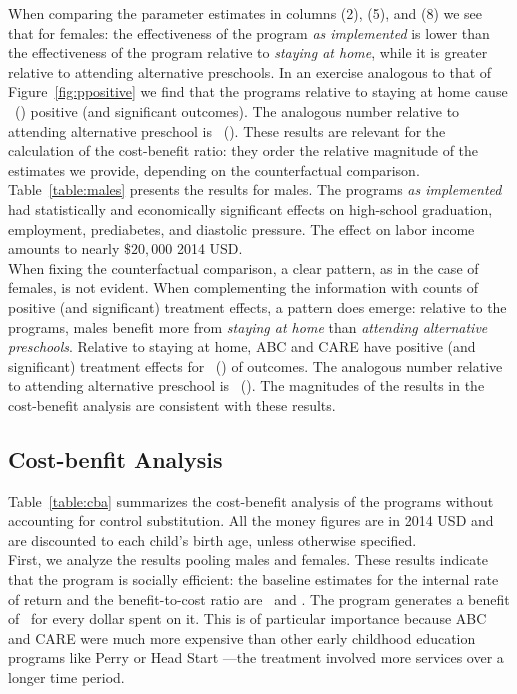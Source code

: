 \noindent When comparing the parameter estimates in columns (2), (5), and (8) we see that for females: the effectiveness of the program \textit{as implemented} is lower than the effectiveness of the program relative to \textit{staying at home}, while it is greater relative to attending alternative preschools. In an exercise analogous to that of Figure~\ref{fig:ppositive} we find that the programs relative to staying at home cause \positivecsnf\ (\positivescsnf) positive (and significant outcomes). The analogous number relative to attending alternative preschool is \positivecsaf\ (\positivescsaf). These results are relevant for the calculation of the cost-benefit ratio: they order the relative magnitude of the estimates we provide, depending on the counterfactual comparison.\\ 

\noindent Table~\ref{table:males} presents the results for males. The programs \textit{as implemented} had statistically and economically significant effects on high-school graduation, employment, prediabetes, and diastolic pressure. The effect on labor income amounts to nearly $\$20,000$ 2014 USD.\\

\noindent When fixing the counterfactual comparison, a clear pattern, as in the case of females, is not evident. When complementing the information with counts of positive (and significant) treatment effects, a pattern does emerge: relative to the programs, males benefit more from \textit{staying at home} than \textit{attending alternative preschools}. Relative to staying at home, ABC and CARE have positive (and significant) treatment effects for \positivecsnm\ (\positivescsnm) of outcomes. The analogous number relative to attending alternative preschool is \positivecsam\ (\positivescsam). The magnitudes of the results in the cost-benefit analysis are  consistent with these results.

\subsection{Cost-benfit Analysis} \label{section:cbaresults}

\noindent Table~\ref{table:cba} summarizes the cost-benefit analysis of the programs without accounting for control substitution. All the money figures are in 2014 USD and are discounted to each child's birth age, unless otherwise specified.\\

\noindent First, we analyze the results pooling males and females. These results indicate that the program is socially efficient: the baseline estimates for the internal rate of return and the benefit-to-cost ratio are \irrp\ and \bcp. The program generates a benefit of \bcp\ for every dollar spent on it. This is of particular importance because ABC and CARE were much more expensive than other early childhood education programs like Perry or Head Start \citep{Elango_Hojman_etal_2016_Early-Edu}---the treatment involved more services over a longer time period. \\ 

